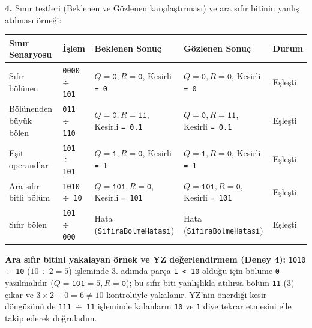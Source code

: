 \documentclass[10pt,a4paper]{article}
\begin{document}
\textbf{4.} Sınır testleri (Beklenen ve Gözlenen karşılaştırması) ve ara sıfır bitinin yanlış atılması örneği:

\begin{center}
\small
\begin{tabular}{lllll}
\toprule
Sınır Senaryosu & İşlem & Beklenen Sonuç & Gözlenen Sonuç & Durum \\
\midrule
Sıfır bölünen & \texttt{0000 $\div$ 101} & $Q=\texttt{0}, R=\texttt{0}$, Kesirli \texttt{= 0} & $Q=\texttt{0}, R=\texttt{0}$, Kesirli \texttt{= 0} & Eşleşti \\
Bölünenden büyük bölen & \texttt{011 $\div$ 110} & $Q=\texttt{0}, R=\texttt{11}$, Kesirli \texttt{= 0.1} & $Q=\texttt{0}, R=\texttt{11}$, Kesirli \texttt{= 0.1} & Eşleşti \\
Eşit operandlar & \texttt{101 $\div$ 101} & $Q=\texttt{1}, R=\texttt{0}$, Kesirli \texttt{= 1} & $Q=\texttt{1}, R=\texttt{0}$, Kesirli \texttt{= 1} & Eşleşti \\
Ara sıfır bitli bölüm & \texttt{1010 $\div$ 10} & $Q=\texttt{101}, R=\texttt{0}$, Kesirli \texttt{= 101} & $Q=\texttt{101}, R=\texttt{0}$, Kesirli \texttt{= 101} & Eşleşti \\
Sıfır bölen & \texttt{101 $\div$ 000} & Hata (\texttt{SifiraBolmeHatasi}) & Hata (\texttt{SifiraBolmeHatasi}) & Eşleşti \\
\bottomrule
\end{tabular}
\end{center}

\textbf{Ara sıfır bitini yakalayan örnek ve YZ değerlendirmem (Deney 4):} \texttt{1010 $\div$ 10} ($10 \div 2 = 5$) işleminde 3. adımda parça \texttt{1 < 10} olduğu için bölüme \texttt{0} yazılmalıdır ($Q=\texttt{101}=5, R=\texttt{0}$); bu sıfır biti yanlışlıkla atılırsa bölüm \texttt{11} (3) çıkar ve $3 \times 2 + 0 = 6 \ne 10$ kontrolüyle yakalanır. YZ'nin önerdiği kesir döngüsünü de \texttt{111 $\div$ 11} işleminde kalanların \texttt{10} ve \texttt{1} diye tekrar etmesini elle takip ederek doğruladım.
\end{document}
